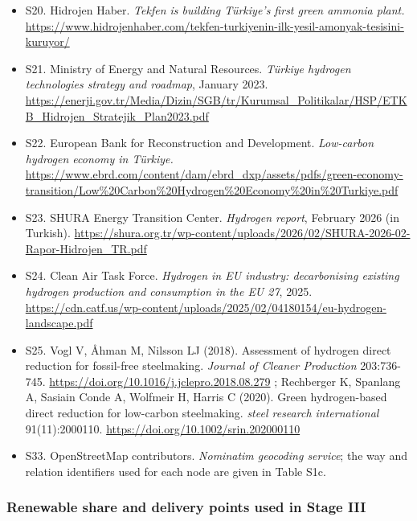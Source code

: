 \documentclass[11pt,a4paper]{article}
\begin{document}
\begin{itemize}
  \item S20. Hidrojen Haber. \textit{Tekfen is building Türkiye's first green ammonia plant.} \url{https://www.hidrojenhaber.com/tekfen-turkiyenin-ilk-yesil-amonyak-tesisini-kuruyor/}

  \item S21. Ministry of Energy and Natural Resources. \textit{Türkiye hydrogen technologies strategy and roadmap}, January 2023. \url{https://enerji.gov.tr/Media/Dizin/SGB/tr/Kurumsal_Politikalar/HSP/ETKB_Hidrojen_Stratejik_Plan2023.pdf}

  \item S22. European Bank for Reconstruction and Development. \textit{Low-carbon hydrogen economy in Türkiye.} \url{https://www.ebrd.com/content/dam/ebrd_dxp/assets/pdfs/green-economy-transition/Low%20Carbon%20Hydrogen%20Economy%20in%20Turkiye.pdf}

  \item S23. SHURA Energy Transition Center. \textit{Hydrogen report}, February 2026 (in Turkish). \url{https://shura.org.tr/wp-content/uploads/2026/02/SHURA-2026-02-Rapor-Hidrojen_TR.pdf}

  \item S24. Clean Air Task Force. \textit{Hydrogen in EU industry: decarbonising existing hydrogen production and consumption in the EU 27}, 2025. \url{https://cdn.catf.us/wp-content/uploads/2025/02/04180154/eu-hydrogen-landscape.pdf}

  \item S25. Vogl V, Åhman M, Nilsson LJ (2018). Assessment of hydrogen direct reduction for fossil-free steelmaking. \textit{Journal of Cleaner Production} 203:736-745. \url{https://doi.org/10.1016/j.jclepro.2018.08.279} ; Rechberger K, Spanlang A, Sasiain Conde A, Wolfmeir H, Harris C (2020). Green hydrogen-based direct reduction for low-carbon steelmaking. \textit{steel research international} 91(11):2000110. \url{https://doi.org/10.1002/srin.202000110}

  \item S33. OpenStreetMap contributors. \textit{Nominatim geocoding service}; the way and relation identifiers used for each node are given in Table S1c.

\end{itemize}

\subsubsection{Renewable share and delivery points used in Stage III}
\end{document}
